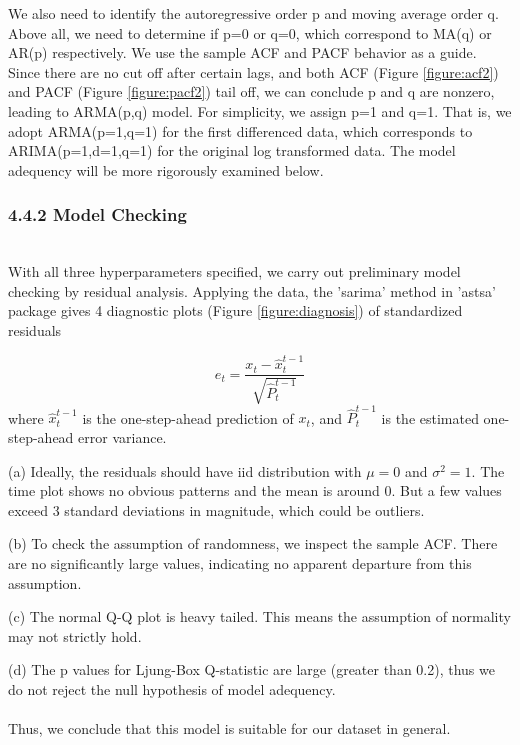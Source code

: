 \documentclass[letterpaper]{article} %
\begin{document}
We also need to identify the autoregressive order p and moving average order q. Above all, we need to determine if p=0 or q=0, which correspond to MA(q) or AR(p) respectively. We use the sample ACF and PACF behavior as a guide. Since there are no cut off after certain lags, and both ACF (Figure \ref{figure:acf2}) and PACF (Figure \ref{figure:pacf2}) tail off, we can conclude p and q are nonzero, leading to ARMA(p,q) model. For simplicity, we assign p=1 and q=1. That is, we adopt ARMA(p=1,q=1) for the first differenced data, which corresponds to ARIMA(p=1,d=1,q=1) for the original log transformed data. The model adequency will be more rigorously examined below.


\subsubsection*{4.4.2 Model Checking}~\\
With all three hyperparameters specified, we carry out preliminary model checking by residual analysis. Applying the data, the 'sarima' method in 'astsa' package gives 4 diagnostic plots (Figure \ref{figure:diagnosis}) of standardized residuals

$$ e_t = \frac{x_t - \hat{x}_{t}^{t-1}} {\sqrt{\hat{P}_{t}^{t-1}}} $$
where $\hat{x}_{t}^{t-1}$ is the one-step-ahead prediction of $x_t$,
and $\hat{P}_{t}^{t-1}$ is the estimated one-step-ahead error variance. \\

\par
(a) Ideally, the residuals should have iid distribution with $\mu=0$ and $\sigma^2=1$. The time plot shows no obvious patterns and the mean is around 0. But a few values exceed 3 standard deviations in magnitude, which could be outliers.
\par
(b) To check the assumption of randomness, we inspect the sample ACF. There are no significantly large values, indicating no apparent departure from this assumption.
\par
(c) The normal Q-Q plot is heavy tailed. This means the assumption of normality may not strictly hold.
\par
(d) The p values for Ljung-Box Q-statistic are large (greater than 0.2), thus we do not reject the null hypothesis of model adequency.
\\ \\ Thus, we conclude that this model is suitable for our dataset in general.

\end{document}
